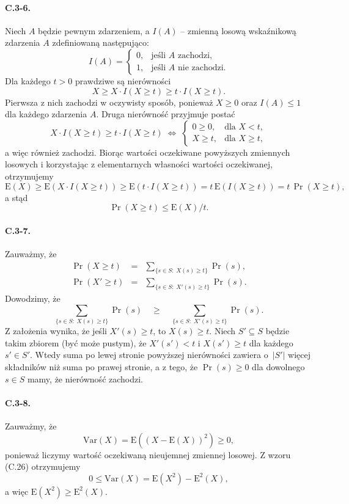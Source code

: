 \paragraph{C.3-6.}
Niech $A$ będzie pewnym zdarzeniem, a $I(A)$ -- zmienną losową wskaźnikową zdarzenia $A$ zdefiniowaną następująco:
\[
	I(A) = \left\{\begin{array}{rl}
		0, & \mbox{jeśli }A\mbox{ zachodzi,} \\
		1, & \mbox{jeśli }A\mbox{ nie zachodzi.}
	\end{array}\right.
\]
Dla każdego $t>0$ prawdziwe są nierówności
\[
	X\ge X\cdot I(X\ge t)\ge t\cdot I(X\ge t).
\]
Pierwsza z nich zachodzi w oczywisty sposób, ponieważ $X\ge 0$ oraz $I(A)\le 1$ dla każdego zdarzenia $A$. Druga nierówność przyjmuje postać
\[
	X\cdot I(X\ge t)\ge t\cdot I(X\ge t)\;\Leftrightarrow\;\left\{\begin{array}{rl}
		0\ge 0, & \mbox{dla }X<t, \\
		X\ge t, & \mbox{dla }X\ge t,
	\end{array}\right.
\]
a więc również zachodzi. Biorąc wartości oczekiwane powyższych zmiennych losowych i korzystając z elementarnych własności wartości oczekiwanej, otrzymujemy
\[
	\mathrm{E}(X)\ge\mathrm{E}(X\cdot I(X\ge t))\ge\mathrm{E}(t\cdot I(X\ge t)) = t\,\mathrm{E}(I(X\ge t)) = t\,\Pr(X\ge t),
\]
a stąd
\[
	\Pr(X\ge t)\le\mathrm{E}(X)/t.
\]

\paragraph{C.3-7.}
Zauważmy, że
\begin{eqnarray*}
	\Pr(X\ge t) &=& \sum_{\{ s\in S:\;X(s)\ge t\}}\Pr(s), \\
	\Pr(X'\ge t) &=& \sum_{\{ s\in S:\;X'(s)\ge t\}}\Pr(s).
\end{eqnarray*}
Dowodzimy, że
\[
	\sum_{\{ s\in S:\;X(s)\ge t\}}\Pr(s)\quad\ge\quad\sum_{\{ s\in S:\;X'(s)\ge t\}}\Pr(s).
\]
Z założenia wynika, że jeśli $X'(s)\ge t$, to $X(s)\ge t$. Niech $S'\subseteq S$ będzie takim zbiorem (być może pustym), że $X'(s')<t$ i $X(s')\ge t$ dla każdego $s'\in S'$. Wtedy suma po lewej stronie powyższej nierówności zawiera o~$|S'|$ więcej składników niż suma po prawej stronie, a z tego, że $\Pr(s)\ge 0$ dla dowolnego $s\in S$ mamy, że nierówność zachodzi.

\paragraph{C.3-8.}
Zauważmy, że
\[
	\mathrm{Var}(X) = \mathrm{E}\left((X-\mathrm{E}(X))^2\right)\ge 0,
\]
ponieważ liczymy wartość oczekiwaną nieujemnej zmiennej losowej. Z wzoru (C.26) otrzymujemy
\[
	0\le\mathrm{Var}(X) = \mathrm{E}\left(X^2\right)-\mathrm{E}^2(X),
\]
a więc $\mathrm{E}\left(X^2\right)\ge\mathrm{E}^2(X)$.

